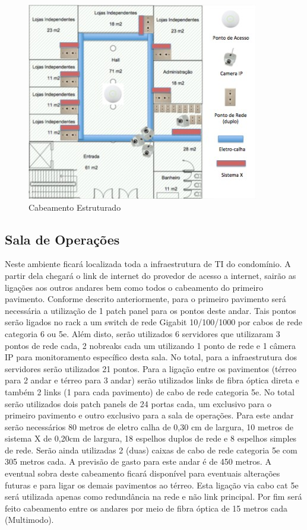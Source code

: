 \documentclass[	DIV=calc,%
							paper=a4,%
							fontsize=12pt,%
							onecolumn]{scrartcl}	 					%
\begin{document}
\begin{figure}[H]
  \centering
  \includegraphics[width=\textwidth]{terro1} 
  \caption{Cabeamento Estruturado}
  \label{fig:methodology}
\end{figure}

\subsection{Sala de Operações}
{\raggedright Neste ambiente ficará localizada toda a infraestrutura de TI do condomínio. A partir dela
chegará o link de internet do provedor de acesso a internet, sairão as ligações aos outros andares bem como todos o cabeamento do primeiro pavimento.
Conforme descrito anteriormente, para o primeiro pavimento será necessária a utilização de 1 patch panel para os pontos deste andar. Tais pontos serão ligados no rack a um switch de rede Gigabit 10/100/1000 por cabos de rede categoria 6 ou 5e.
Além disto, serão utilizados 6 servidores que utilizaram 3 pontos de rede cada, 2
nobreaks cada um utilizando 1 ponto de rede e 1 câmera IP para monitoramento específico
desta sala. No total, para a infraestrutura dos servidores serão utilizados 21 pontos. Para
a ligação entre os pavimentos (térreo para 2 andar e térreo para 3 andar) serão utilizados
links de fibra óptica direta e também 2 links (1 para cada pavimento) de cabo de rede
categoria 5e.
No total serão utilizados dois patch panels de 24 portas cada, um exclusivo para
o primeiro pavimento e outro exclusivo para a sala de operações.
Para este andar serão necessários 80 metros de eletro calha de 0,30 cm de largura,
10 metros de sistema X de 0,20cm de largura, 18 espelhos duplos de rede e 8 espelhos
simples de rede.
Serão ainda utilizadas 2 (duas) caixas de cabo de rede categoria 5e com 305
metros cada. A previsão de gasto para este andar é de 450 metros. A eventual sobra
deste cabeamento ficará disponível para eventuais alterações futuras e para ligar os demais
pavimentos ao térreo. Esta ligação via cabo cat 5e será utilizada apenas como redundância
na rede e não link principal.
Por fim será feito cabeamento entre os andares por meio de fibra óptica de 15
metros cada (Multimodo).
}
\end{document}
